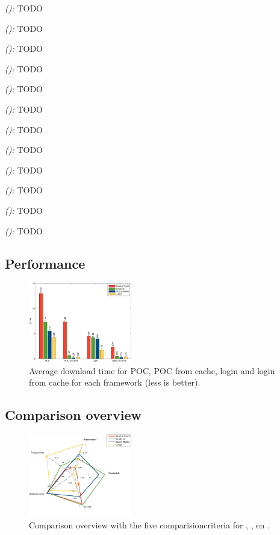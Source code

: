 \documentclass[a4paper]{artikel3}
\newcommand{\framework}[2]{ \emph{#1 (\textbf{#2}): }} %
\begin{document}
\framework{\sta{}}{}
TODO

\framework{\kendoa{}}{}
TODO

\framework{\jqma{}}{}
TODO

\framework{\lungoa{}}{}
TODO


\framework{\sta{}}{}
TODO

\framework{\kendoa{}}{}
TODO

\framework{\jqma{}}{}
TODO

\framework{\lungoa{}}{}
TODO


\framework{\sta{}}{}
TODO

\framework{\kendoa{}}{}
TODO

\framework{\jqma{}}{}
TODO

\framework{\lungoa{}}{}
TODO
  

\subsection{Performance} %
\label{sec:evaluation-performance}

\begin{figure}
  \centering
  \includegraphics[width=0.4\textwidth]{../Masterproef/figuren/performance.pdf}
  \caption{Average download time for POC,  POC from cache,  login and login from cache for each framework (less is better).}
  \label{fig:performance}
\end{figure}


\subsection{Comparison overview} %
\label{sec:evaluation-overview}

\begin{figure}
  \centering
  \includegraphics[width=0.4\textwidth]{../Masterproef/figuren/spidergraph.pdf}
  \caption{Comparison overview with the five comparisioncriteria for \st{},  \kendo{},  \jqm{} en \lungo{}.}
  \label{fig:spidergraph}
\end{figure}
\end{document}
